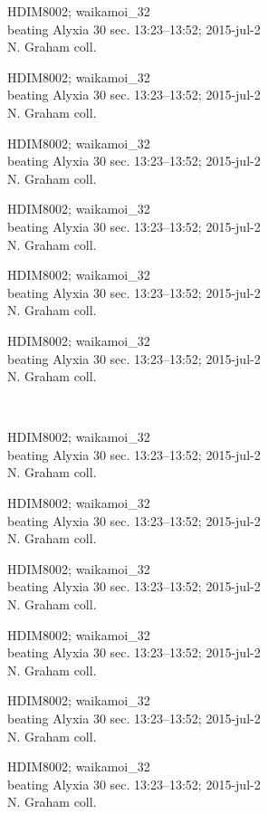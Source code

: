 \documentclass[2pt]{extarticle}
\begin{document}
\noindent
\parbox{0.16\textwidth}{\tiny \raggedright \rule[-0.3\baselineskip]{0pt}{10pt}HDIM8002; waikamoi\_32\\ beating Alyxia 30 sec. 13:23--13:52; 2015-jul-2\\ N. Graham coll.}
\parbox{0.16\textwidth}{\tiny \raggedright \rule[-0.3\baselineskip]{0pt}{10pt}HDIM8002; waikamoi\_32\\ beating Alyxia 30 sec. 13:23--13:52; 2015-jul-2\\ N. Graham coll.}
\parbox{0.16\textwidth}{\tiny \raggedright \rule[-0.3\baselineskip]{0pt}{10pt}HDIM8002; waikamoi\_32\\ beating Alyxia 30 sec. 13:23--13:52; 2015-jul-2\\ N. Graham coll.}
\parbox{0.16\textwidth}{\tiny \raggedright \rule[-0.3\baselineskip]{0pt}{10pt}HDIM8002; waikamoi\_32\\ beating Alyxia 30 sec. 13:23--13:52; 2015-jul-2\\ N. Graham coll.}
\parbox{0.16\textwidth}{\tiny \raggedright \rule[-0.3\baselineskip]{0pt}{10pt}HDIM8002; waikamoi\_32\\ beating Alyxia 30 sec. 13:23--13:52; 2015-jul-2\\ N. Graham coll.}
\parbox{0.16\textwidth}{\tiny \raggedright \rule[-0.3\baselineskip]{0pt}{10pt}HDIM8002; waikamoi\_32\\ beating Alyxia 30 sec. 13:23--13:52; 2015-jul-2\\ N. Graham coll.} \\ 
\vspace{0.001in} 

\noindent
\parbox{0.16\textwidth}{\tiny \raggedright \rule[-0.3\baselineskip]{0pt}{10pt}HDIM8002; waikamoi\_32\\ beating Alyxia 30 sec. 13:23--13:52; 2015-jul-2\\ N. Graham coll.}
\parbox{0.16\textwidth}{\tiny \raggedright \rule[-0.3\baselineskip]{0pt}{10pt}HDIM8002; waikamoi\_32\\ beating Alyxia 30 sec. 13:23--13:52; 2015-jul-2\\ N. Graham coll.}
\parbox{0.16\textwidth}{\tiny \raggedright \rule[-0.3\baselineskip]{0pt}{10pt}HDIM8002; waikamoi\_32\\ beating Alyxia 30 sec. 13:23--13:52; 2015-jul-2\\ N. Graham coll.}
\parbox{0.16\textwidth}{\tiny \raggedright \rule[-0.3\baselineskip]{0pt}{10pt}HDIM8002; waikamoi\_32\\ beating Alyxia 30 sec. 13:23--13:52; 2015-jul-2\\ N. Graham coll.}
\parbox{0.16\textwidth}{\tiny \raggedright \rule[-0.3\baselineskip]{0pt}{10pt}HDIM8002; waikamoi\_32\\ beating Alyxia 30 sec. 13:23--13:52; 2015-jul-2\\ N. Graham coll.}
\parbox{0.16\textwidth}{\tiny \raggedright \rule[-0.3\baselineskip]{0pt}{10pt}HDIM8002; waikamoi\_32\\ beating Alyxia 30 sec. 13:23--13:52; 2015-jul-2\\ N. Graham coll.} \\ 
\vspace{0.001in} 
\end{document}
